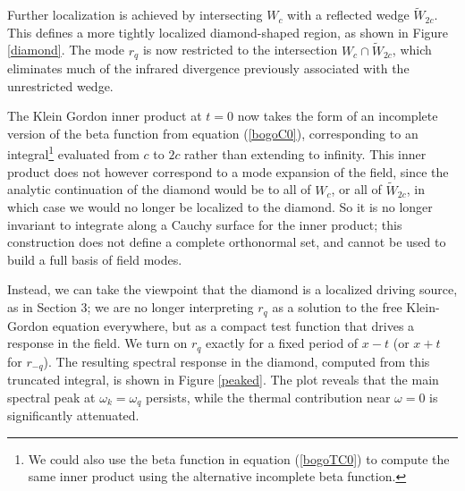 \documentclass[12pt,a4paper]{article}
\begin{document}
Further localization is achieved by intersecting $W_c$ with a reflected wedge $\widetilde{W}_{2c}$. This defines a more tightly localized diamond-shaped region, as shown in Figure \ref{diamond}. The mode $r_q$ is now restricted to the intersection $W_c \cap \widetilde{W}_{2c}$, which eliminates much of the infrared divergence previously associated with the unrestricted wedge.

The Klein Gordon inner product at $t=0$ now takes the form of an incomplete version of the beta function from equation (\ref{bogoC0}), corresponding to an integral\footnote{We could also use the beta function in equation (\ref{bogoTC0}) to compute the same inner product using the alternative incomplete beta function.} evaluated from $c$ to $2c$ rather than extending to infinity. This inner product does not however correspond to a mode expansion of the field, since the analytic continuation of the diamond would be to all of $W_c$, or all of $\widetilde{W}_{2c}$, in which case we would no longer be localized to the diamond.  So it is no longer invariant to integrate along a Cauchy surface for the inner product; this construction does not define a complete orthonormal set, and cannot be used to build a full basis of field modes.

Instead, we can take the viewpoint that the diamond is a localized driving source, as in Section 3; we are no longer interpreting $r_q$ as a solution to the free Klein-Gordon equation everywhere, but as a compact test function that drives a response in the field. We turn on $r_q$ exactly for a fixed period of $x-t$ (or $x+t$ for $r_{-q}$). The resulting spectral response in the diamond, computed from this truncated integral, is shown in Figure \ref{peaked}. The plot reveals that the main spectral peak at $\omega_k = \omega_q$ persists, while the thermal contribution near $\omega = 0$ is significantly attenuated.
\end{document}
